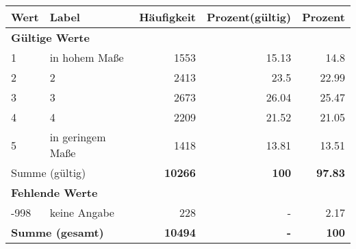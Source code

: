      \begin{longtable}{lXrrr}
     \toprule
     \textbf{Wert} & \textbf{Label} & \textbf{Häufigkeit} & \textbf{Prozent(gültig)} & \textbf{Prozent} \\
     \endhead
     \midrule
     \multicolumn{5}{l}{\textbf{Gültige Werte}}\\

     1 &
     \multicolumn{1}{X}{ in hohem Maße   } &


       \num{1553} &
       \num[round-mode=places,round-precision=2]{15,13} &
         \num[round-mode=places,round-precision=2]{14,8} \\

     2 &
     \multicolumn{1}{X}{ 2   } &


       \num{2413} &
       \num[round-mode=places,round-precision=2]{23,5} &
         \num[round-mode=places,round-precision=2]{22,99} \\

     3 &
     \multicolumn{1}{X}{ 3   } &


       \num{2673} &
       \num[round-mode=places,round-precision=2]{26,04} &
         \num[round-mode=places,round-precision=2]{25,47} \\

     4 &
     \multicolumn{1}{X}{ 4   } &


       \num{2209} &
       \num[round-mode=places,round-precision=2]{21,52} &
         \num[round-mode=places,round-precision=2]{21,05} \\

     5 &
     \multicolumn{1}{X}{ in geringem Maße   } &


       \num{1418} &
       \num[round-mode=places,round-precision=2]{13,81} &
         \num[round-mode=places,round-precision=2]{13,51} \\
     \midrule
     \multicolumn{2}{l}{Summe (gültig)} &
       \textbf{\num{10266}} &
     \textbf{100} &
       \textbf{\num[round-mode=places,round-precision=2]{97,83}} \\
     \multicolumn{5}{l}{\textbf{Fehlende Werte}}\\
       -998 &
       keine Angabe &
         \num{228} &
        - &
         \num[round-mode=places,round-precision=2]{2,17} \\
     \midrule
     \multicolumn{2}{l}{\textbf{Summe (gesamt)}} &
          \textbf{\num{10494}} &
        \textbf{-} &
        \textbf{100} \\
     \bottomrule
     \end{longtable}
     
